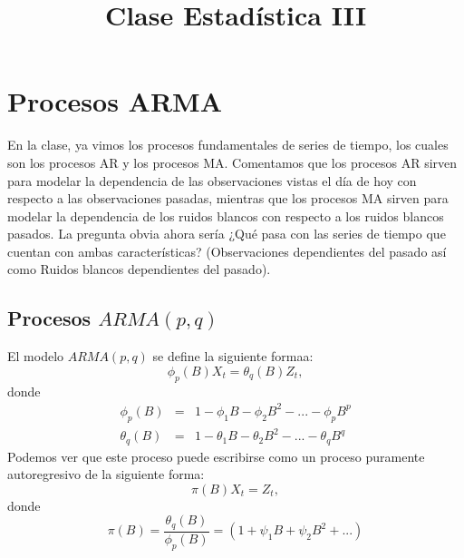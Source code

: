 \documentclass[10pt,a4paper]{article}
\title{Clase Estadística III}
\begin{document}
	\maketitle
\section{Procesos ARMA}
	En la clase, ya vimos los procesos fundamentales de series de tiempo, los cuales son los procesos AR y los procesos MA.
	Comentamos que los procesos AR sirven para modelar la dependencia de las observaciones vistas el día de hoy con respecto a las observaciones pasadas, mientras que los procesos MA sirven para modelar la dependencia de los ruidos blancos con respecto a los ruidos blancos pasados. La pregunta obvia ahora sería ¿Qué pasa con las series de tiempo que cuentan con ambas características? (Observaciones dependientes del pasado así como Ruidos blancos dependientes del pasado).
	\subsection{Procesos $ARMA(p,q)$}
	El modelo $ARMA(p,q)$ se define la siguiente formaa:
	\begin{equation} \label{eq:ARMA}
		\phi_p(B)X_t = \theta_q(B)Z_t,
	\end{equation}
donde
	\begin{eqnarray}
		\phi_p(B)&=& 1-\phi_1 B -\phi_2 B^2-...-\phi_pB^p \\
		\theta_q(B)&=& 1-\theta_1 B -\theta_2 B^2-...-\theta_qB^q 
	\end{eqnarray}
Podemos ver que este proceso puede escribirse como un proceso puramente autoregresivo de la siguiente forma:
\begin{equation}
	\pi(B) X_t = Z_t,
\end{equation}
donde
\begin{equation}
	\pi(B) = \frac{\theta_q(B)}{\phi_p(B)} = (1+\psi_1 B +\psi_2 B^2+...)
\end{equation}
\end{document}

